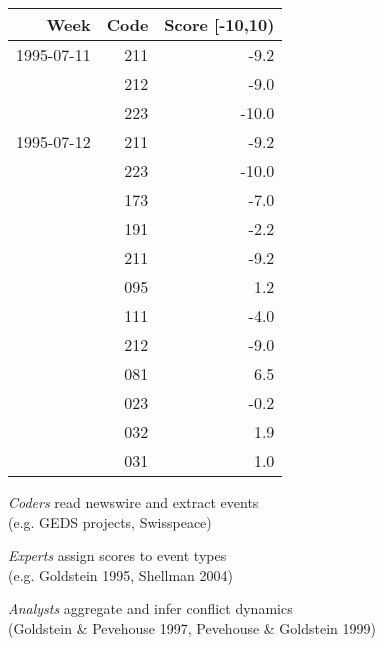 \documentclass{mediumfoils}
\newcommand{\mkgrey}[1]{#1}
\begin{document}
\newpage


\begin{center} 
{\footnotesize
\begin{tabular}{rrr} \toprule
Week       & Code & Score [-10,10) \\ \midrule
1995-07-11 & 211 & -9.2 \\
 & 212 & -9.0 \\
 & 223 & -10.0 \\ \midrule
1995-07-12 & 211 & -9.2 \\
 & 223 & -10.0 \\
 & 173 & -7.0 \\
 & 191 & -2.2 \\
 & 211 & -9.2 \\
 & 095 & 1.2 \\
 & 111 & -4.0  \\
 & 212 & -9.0 \\
 & 081 & 6.5 \\
 & 023 & -0.2 \\
 & 032 & 1.9 \\
 & 031 & 1.0 \\ \bottomrule
\end{tabular}
}
\end{center}


\textit{Coders} read newswire and extract events\\ \mkgrey{(e.g. GEDS projects, Swisspeace)}

\textit{Experts} assign scores to event types\\
\mkgrey{(e.g. Goldstein 1995, Shellman 2004)}

\textit{Analysts} aggregate and infer conflict dynamics\\ \mkgrey{(Goldstein \& Pevehouse 1997, Pevehouse \& Goldstein 1999)}

%
%
%
%
%
%
%
%
%
%
%
%
\end{document}

